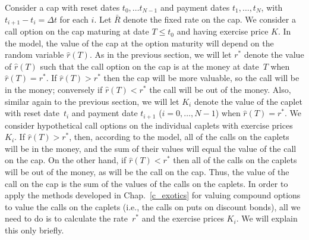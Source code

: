 Consider a cap with reset dates $t_0,\ldots t_{N-1}$ and payment dates $t_1,\ldots, t_N$, with $t_{i+1}-t_i=\varDelta t$ for each $i$.  Let $\bar{R}$ denote the fixed rate on the cap.  We consider a call option on the cap maturing at date $T \leq t_0$ and having exercise price $K$.  In the model, the value of the cap at the option maturity will depend on the random variable $\hat{r}(T)$.  As in the previous section, we will let $r^*$ denote the value of $\hat{r}(T)$ such that the call option on the cap is at the money at date~$T$ when $\hat{r}(T)=r^*$.  If $\hat{r}(T)>r^*$ then the cap will be more valuable, so the call will be in the money; conversely if $\hat{r}(T)<r^*$ the call will be out of the money.  Also, similar again to the previous section, we will let $K_i$ denote the value of the caplet with reset date~$t_i$ and payment date $t_{i+1}$ ($i=0,\ldots,N-1$) when $\hat{r}(T)=r^*$.  We consider hypothetical call options on the individual caplets with exercise prices $K_i$.  If $\hat{r}(T)>r^*$, then, according to the model, all of the calls on the caplets will be in the money, and the sum of their values will equal the value of the call on the cap.  On the other hand, if $\hat{r}(T)<r^*$ then all of the calls on the caplets will be out of the money, as will be the call on the cap.  Thus, the value of the call on the cap is the sum of the values of the calls on the caplets.  
In order to apply the methods developed in Chap.~\ref{c_exotics} for valuing compound options to value the calls on the caplets (i.e., the calls on puts on discount bonds), all we need to do is to calculate the rate~$r^*$ and the exercise prices $K_i$.  We will explain this only briefly.

